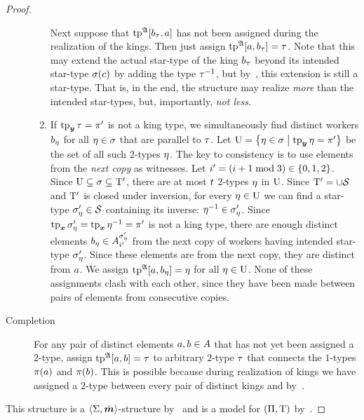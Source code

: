 \begin{proof}
\begin{description}
\begin{enumerate}
    Next suppose that $\operatorname{tp}^{\mathfrak{A}}[b_{\tau},a]$ has not been assigned during
    the realization of the kings.
    Then just assign $\operatorname{tp}^{\mathfrak{A}}[a,b_{\tau}] = \tau$.
    Note that this may extend the actual star-type of the king $b_{\tau}$ beyond its
    intended star-type $\sigma(c)$ by adding the type $\tau^{-1}$, but
    by~, this extension is still a star-type. That is,
    in the end, the structure may realize \emph{more} than the intended
    star-types, but, importantly, \emph{not less}.
    \item If $\operatorname{tp}_{\bm{y}}\tau = {\pi'}$ is not a king type, we simultaneously find
    distinct workers $b_{\eta}$ for all $\eta \in \sigma$ that are parallel to
    $\tau$.
    Let $\mathrm{U} = \left\{\eta \in \sigma\mathrel{}\middle|\mathrel{}\operatorname{tp}_{\bm{y}}\eta = {\pi'}\right\}$ be the set of
    all such $2$-types $\eta$.
    The key to consistency is to use elements from the \emph{next copy} as
    witnesses. Let ${i'} = (i+1 \bmod 3) \in \left\{0,1,2\right\}$. Since $\mathrm{U}
    \subseteq \sigma \subseteq {\mathrm{T}'}$, there are at most $t$ $2$-types $\eta$ in $\mathrm{U}$. Since ${\mathrm{T}'} = \cup\mathcal{S}$ and ${\mathrm{T}'}$ is
    closed under inversion, for every $\eta \in \mathrm{U}$ we can find a star-type
    ${\sigma_{\eta}'} \in \mathcal{S}$ containing its inverse: $\eta^{-1} \in
    {\sigma_{\eta}'}$. Since $\operatorname{tp}_{\bm{x}}{\sigma_{\eta}'} = \operatorname{tp}_{\bm{x}}\eta^{-1} = {\pi'}$ is not
    a king type, there are enough distinct elements $b_{\eta} \in
    A^{{\sigma_{\eta}'}}_{{i'}}$ from the next copy of workers having intended
    star-type ${\sigma_{\eta}'}$. Since these elements are from the next copy, they
    are distinct from $a$.
    We assign $\operatorname{tp}^{\mathfrak{A}}[a,b_{\eta}] = \eta$ for all $\eta \in \mathrm{U}$.
    None of these assignments clash with each other, since they have been made
    between pairs of elements from consecutive copies.
  \end{enumerate}
  \item[Completion] For any pair of distinct elements $a, b \in A$ that
  has not yet been assigned a $2$-type, assign $\operatorname{tp}^{\mathfrak{A}}[a,b] = \tau$ to
  arbitrary $2$-type $\tau$ that connects the $1$-types $\pi(a)$ and
  $\pi(b)$. This is possible because during realization of kings we have
  assigned a $2$-type between every pair of distinct kings and by~.
\end{description}
This structure is a $\left\langle \mathrm{\Sigma},\bar{\bm{m}} \right\rangle$-structure by~ and
is a model for $(\Pi,\mathrm{T})$ by~.
\end{proof}


